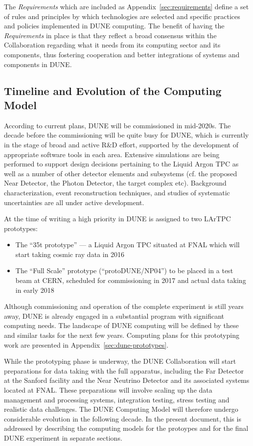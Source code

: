 The \textit{Requirements} which are included as Appendix~\ref{sec:requirements}
define a set of rules and principles by which technologies are selected and specific practices and policies implemented in DUNE computing.
The benefit of having the \textit{Requirements} in place is that they reflect a broad consensus within the Collaboration regarding what it needs from
its computing sector and its components, thus fostering cooperation and better integrations of systems and components in DUNE.

\subsection{Timeline and Evolution of the Computing Model}
According to current plans, DUNE will be commissioned in mid-2020s. The decade before the commissioning will be quite busy
for DUNE, which is currently in the stage of broad and active R\&D effort, supported by the development of appropriate 
software tools in each area. Extensive simulations are being performed to support design decisions pertaining to the Liquid 
Argon TPC as well as a number of other detector elements and subsystems (cf. the proposed Near Detector, the Photon Detector, 
the target complex etc). Background characterization, event reconstruction techniques, and studies of systematic 
uncertainties are all under active development.

At the time of writing a high priority in DUNE is assigned to two LArTPC prototypes:
\begin{itemize}
\item The ``35t prototype'' --- a Liquid Argon TPC situated at FNAL which will start taking cosmic ray data in 2016
\item The ``Full Scale'' prototype (``protoDUNE/NP04'') to be placed in a test beam at CERN, 
scheduled for commissioning in 2017 and actual data taking in early 2018
\end{itemize}
\noindent
Although commissioning and operation of the complete experiment is still years away, DUNE is
already engaged in a substantial program with significant computing needs. The
landscape of DUNE computing will be defined by these and similar tasks for the next few years. Computing plans for this prototyping
work are presented in Appendix~\ref{sec:dune-prototypes}.

While the prototyping phase is underway, the DUNE Collaboration will start preparations for data taking with the
full apparatus, including the Far Detector at the Sanford facility and the Near Neutrino Detector and its associated systems
located at FNAL.  These preparations will involve scaling up the data management and processing systems,
integration testing,  stress testing and realistic data challenges.
The DUNE Computing Model will therefore undergo considerable evolution in the following decade. In the present document,
this is addressed  by describing the computing models for the protoypes and for the final DUNE experiment in separate sections.

